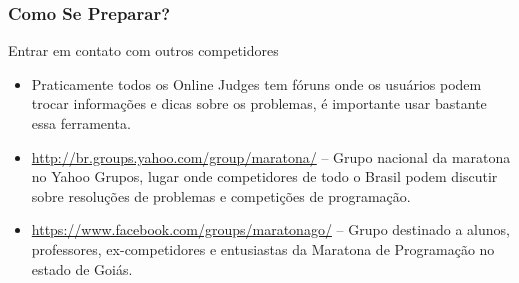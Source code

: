 \begin{frame}
\frametitle{Como Se Preparar?}
\begin{block}{Entrar em contato com outros competidores}
\begin{itemize}	
	\item Praticamente todos os Online Judges tem fóruns onde os usuários podem trocar informações e dicas sobre os problemas, é importante usar bastante essa ferramenta.
	\item \url{http://br.groups.yahoo.com/group/maratona/} -- Grupo nacional da maratona no Yahoo Grupos, lugar onde competidores de todo o Brasil podem discutir sobre resoluções de problemas e competições de programação.
	\item \url{https://www.facebook.com/groups/maratonago/} -- Grupo destinado a alunos, professores, ex-competidores e entusiastas da Maratona de Programação no estado de Goiás. 
\end{itemize}
\end{block}
\end{frame}


